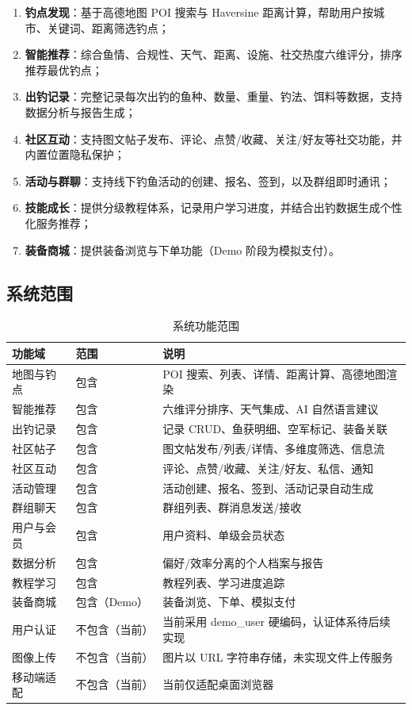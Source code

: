 \documentclass[12pt,a4paper]{ctexart}
\begin{document}
\begin{enumerate}
  \item \textbf{钓点发现}：基于高德地图 POI 搜索与 Haversine 距离计算，帮助用户按城市、关键词、距离筛选钓点；
  \item \textbf{智能推荐}：综合鱼情、合规性、天气、距离、设施、社交热度六维评分，排序推荐最优钓点；
  \item \textbf{出钓记录}：完整记录每次出钓的鱼种、数量、重量、钓法、饵料等数据，支持数据分析与报告生成；
  \item \textbf{社区互动}：支持图文帖子发布、评论、点赞/收藏、关注/好友等社交功能，并内置位置隐私保护；
  \item \textbf{活动与群聊}：支持线下钓鱼活动的创建、报名、签到，以及群组即时通讯；
  \item \textbf{技能成长}：提供分级教程体系，记录用户学习进度，并结合出钓数据生成个性化服务推荐；
  \item \textbf{装备商城}：提供装备浏览与下单功能（Demo 阶段为模拟支付）。
\end{enumerate}

\subsection{系统范围}

\begin{table}[H]
  \centering
  \caption{系统功能范围}
  \label{tab:scope}
  \begin{tabular}{p{2.5cm}p{3cm}p{6.5cm}}
    \toprule
    \textbf{功能域} & \textbf{范围} & \textbf{说明} \\
    \midrule
    地图与钓点 & 包含 & POI 搜索、列表、详情、距离计算、高德地图渲染 \\
    智能推荐 & 包含 & 六维评分排序、天气集成、AI 自然语言建议 \\
    出钓记录 & 包含 & 记录 CRUD、鱼获明细、空军标记、装备关联 \\
    社区帖子 & 包含 & 图文帖发布/列表/详情、多维度筛选、信息流 \\
    社区互动 & 包含 & 评论、点赞/收藏、关注/好友、私信、通知 \\
    活动管理 & 包含 & 活动创建、报名、签到、活动记录自动生成 \\
    群组聊天 & 包含 & 群组列表、群消息发送/接收 \\
    用户与会员 & 包含 & 用户资料、单级会员状态 \\
    数据分析 & 包含 & 偏好/效率分离的个人档案与报告 \\
    教程学习 & 包含 & 教程列表、学习进度追踪 \\
    装备商城 & 包含（Demo） & 装备浏览、下单、模拟支付 \\
    用户认证 & 不包含（当前） & 当前采用 demo\_user 硬编码，认证体系待后续实现 \\
    图像上传 & 不包含（当前） & 图片以 URL 字符串存储，未实现文件上传服务 \\
    移动端适配 & 不包含（当前） & 当前仅适配桌面浏览器 \\
    \bottomrule
  \end{tabular}
\end{table}
\end{document}
